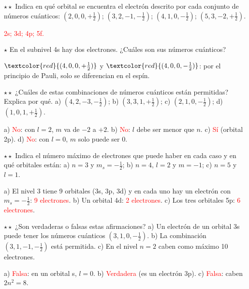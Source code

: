 \begin{exercise}
    \(\star\star\) Indica en qué orbital se encuentra el electrón descrito por cada conjunto de números cuánticos:
    \((2, 0, 0, +\frac{1}{2})\); \((3, 2, -1, -\frac{1}{2})\); \((4, 1, 0, -\frac{1}{2})\); \((5, 3, -2, +\frac{1}{2})\).
    \begin{solu}
        \textcolor{red}{2s; 3d; 4p; 5f.}
    \end{solu}
\end{exercise}

\begin{exercise}
    \(\star\) En el subnivel 4s hay dos electrones. ¿Cuáles son sus números cuánticos?
    \begin{solu}
        \(\textcolor{red}{(4, 0, 0, +\frac{1}{2})}\) y \(\textcolor{red}{(4, 0, 0, -\frac{1}{2})}\): por el principio de Pauli,
        solo se diferencian en el espín.
    \end{solu}
\end{exercise}

\begin{exercise}
    \(\star\star\) ¿Cuáles de estas combinaciones de números cuánticos están permitidas? Explica por qué.
    a) \((4, 2, -3, -\frac{1}{2})\); b) \((3, 3, 1, +\frac{1}{2})\); c) \((2, 1, 0, -\frac{1}{2})\); d) \((1, 0, 1, +\frac{1}{2})\).
    \begin{solu}
        a) \textcolor{red}{No}: con \(l = 2\), \(m\) va de \(-2\) a \(+2\). b) \textcolor{red}{No}: \(l\) debe ser menor que \(n\).
        c) \textcolor{red}{Sí} (orbital 2p). d) \textcolor{red}{No}: con \(l = 0\), \(m\) solo puede ser 0.
    \end{solu}
\end{exercise}

\begin{exercise}
    \(\star\star\) Indica el número máximo de electrones que puede haber en cada caso y en qué orbitales están:
    a) \(n = 3\) y \(m_s = -\frac{1}{2}\); b) \(n = 4\), \(l = 2\) y \(m = -1\); c) \(n = 5\) y \(l = 1\).
    \begin{solu}
        a) El nivel 3 tiene 9 orbitales (3s, 3p, 3d) y en cada uno hay un electrón con \(m_s = -\frac{1}{2}\):
        \textcolor{red}{9 electrones}. b) Un orbital 4d: \textcolor{red}{2 electrones}. c) Los tres orbitales 5p:
        \textcolor{red}{6 electrones}.
    \end{solu}
\end{exercise}

\begin{exercise}
    \(\star\star\) ¿Son verdaderas o falsas estas afirmaciones? a) Un electrón de un orbital 3s puede tener los números cuánticos
    \((3, 1, 0, -\frac{1}{2})\). b) La combinación \((3, 1, -1, -\frac{1}{2})\) está permitida. c) En el nivel \(n = 2\) caben como
    máximo 10 electrones.
    \begin{solu}
        a) \textcolor{red}{Falsa}: en un orbital s, \(l = 0\). b) \textcolor{red}{Verdadera} (es un electrón 3p). c)
        \textcolor{red}{Falsa}: caben \(2n^2 = 8\).
    \end{solu}
\end{exercise}


